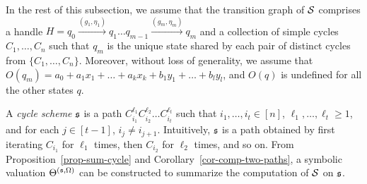 In the rest of this subsection, we assume that the transition graph of ${\mathcal{S} }$ comprises a handle $H=q_0 \xrightarrow{(g_1,\eta_1)} q_1 \dots q_{m-1} \xrightarrow{(g_m,\eta_m)} q_{m}$ and a collection of simple cycles $C_1,\dots,C_n$ such that $q_m$ is the unique state shared by each pair of distinct cycles from $\{C_1,\dots,C_n\}$. Moreover, without loss of generality, we assume that $O(q_m) = a_0 + a_1 x_1 + \dots + a_k x_k + b_1 y_1 + \dots + b_l y_l$, and $O(q)$ is undefined for all the other states $q$.

A \emph{cycle scheme} ${\mathfrak{s} }$ is a path $C_{i_1}^{\ell_1} C_{i_2}^{\ell_2} \dots C_{i_t}^{\ell_t}$ such that $i_1,\dots,i_t \in [n]$, $\ell_1,\dots, \ell_t \ge 1$, and for each $j\in [t-1]$, $i_j \neq i_{j+1}$. Intuitively, ${\mathfrak{s} }$ is a path obtained by first iterating $C_{i_1}$ for $\ell_1$ times, then $C_{i_2}$ for $\ell_2$ times, and so on. From Proposition~\ref{prop-sum-cycle} and Corollary~\ref{cor-comp-two-paths}, a symbolic valuation $\Theta^{({\mathfrak{s} },\Omega)}$ can be constructed 
to summarize the computation of ${\mathcal{S} }$ on ${\mathfrak{s} }$. 


